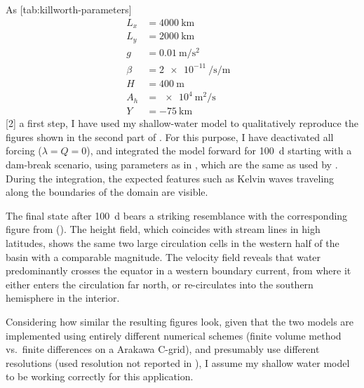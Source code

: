 \subsection{\cite{killworth}}
As%
[tab:killworth-parameters]{%
	\footnotesize%
\begin{align}
	L_x &= \SI{4000}{\kilo\metre}& \\
	L_y &= \SI{2000}{\kilo\metre}& \\
	g &= \SI{0.01}{\metre\per\second\squared}& \\
	\beta &= \SI{2e-11}{\per\second\per\metre}& \\
	H &= \SI{400}{\metre}& \\
	A_h &= \SI{e4}{\metre\squared\per\second}& \\
	Y &= \SI{-75}{\kilo\metre}&
\end{align}
\vspace*{-2\baselineskip}
}[2]%
%
a first step, I have used my shallow-water model to qualitatively reproduce the figures shown in the second part of \cite{killworth}. For this purpose, I have deactivated all forcing (\(\lambda = Q = 0\)), and integrated the model forward for \SI{100}{\day} starting with a dam-break scenario, using parameters as in , which are the same as used by \citeauthor{killworth}. During the integration, the expected features such as Kelvin waves traveling along the boundaries of the domain are visible.

The final state after \SI{100}{\day} bears a striking resemblance with the corresponding figure from \cite{killworth} (). The height field, which coincides with stream lines in high latitudes, shows the same two large circulation cells in the western half of the basin with a comparable magnitude. The velocity field reveals that water predominantly crosses the equator in a western boundary current, from where it either enters the circulation far north, or re-circulates into the southern hemisphere in the interior.

Considering how similar the resulting figures look, given that the two models are implemented using entirely different numerical schemes (finite volume method vs.\ finite differences on a Arakawa C-grid), and presumably use different resolutions (used resolution not reported in \cite{killworth}), I assume my shallow water model to be working correctly for this application.

